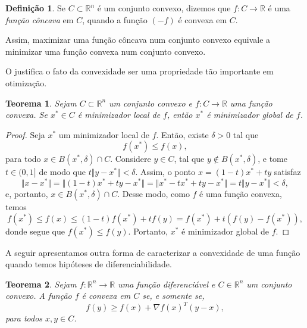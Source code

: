 \documentclass[12pt,a4paper]{scrartcl}
\def\RR{\mathds{R}}
\newtheorem{teo}{Teorema}
\theoremstyle{definition}%
\newtheorem{defi}{Definição}
\begin{document}
\begin{defi}
Se $C \subset \RR^{n}$ é um conjunto convexo, dizemos que $f: C \rightarrow \RR $ é uma \emph{função côncava} em $C$, quando a função $(-f)$ é convexa em $C$.
\end{defi}


Assim, maximizar uma função côncava num conjunto convexo equivale a minimizar uma função convexa num conjunto convexo.


O  justifica o fato da convexidade ser uma propriedade tão importante em otimização.

\begin{teo} \label{teo:convexidade_e_minimizador}
Sejam $C \subset \RR^{n}$ um conjunto convexo e $f:C \rightarrow \RR$ uma função convexa. Se $x^{*} \in C$ é minimizador local de $f$, então $x^{*}$ é minimizador global de $f$.
\end{teo}
\begin{proof}
Seja $x^{*}$ um minimizador local de $f$. Então, existe $\delta > 0$ tal que 
\[
f(x^{*}) \leq f(x), 
\]
para todo $x \in B(x^{*}, \delta) \cap C$. Considere $y \in C$, tal que $y \notin B(x^{*}, \delta)$, e tome $t \in (0,1]$ de modo que $t \Vert y-x^{*} \Vert < \delta$. Assim, o ponto $x = (1-t)x^{*} + ty$ satisfaz
\[
\Vert x - x^{*} \Vert = \Vert (1-t)x^{*} + ty - x^{*} \Vert = \Vert x^{*} - tx^{*} + ty - x^{*} \Vert = t \Vert y - x^{*} \Vert < \delta ,
\]
e, portanto, $x \in B(x^{*}, \delta) \cap C$.
Desse modo, como $f$ é uma função convexa, temos
\[
f(x^{*}) \leq f(x) \leq (1-t)f(x^{*}) + tf(y) = f(x^{*}) + t(f(y)-f(x^{*})),
\]
donde segue que $f(x^{*}) \leq f(y)$.
Portanto, $x^{*}$ é minimizador global de $f$.
\end{proof}

A seguir apresentamos outra forma de caracterizar a convexidade de uma função quando temos hipóteses de diferenciabilidade.

\begin{teo}  \label{teo:diferenciabilidade_e_convexidade}
Sejam $f: \RR^{n} \rightarrow \RR $ uma função diferenciável e $C \in \RR^{n}$ um conjunto convexo. A função $f$ é convexa em $C$ se, e somente se, 
\[
f(y) \geq f(x) + \nabla f(x)^{T}(y-x),
\]
para todos $x, y \in C$.
\end{teo}
\end{document}

